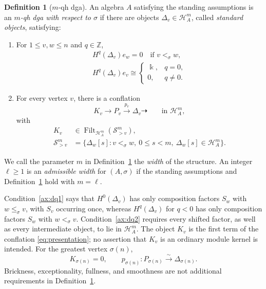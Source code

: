 \documentclass[11pt,a4paper]{article}
\newcommand{\defn}[1]{\textsl{\color{darkblue} #1}}
\renewcommand{\H}{\mathcal H}
\newcommand{\ZZ}{\mathbb{Z}}
\newcommand{\std}{\Delta}
\DeclareMathOperator{\Filt}{Filt}
\theoremstyle{plain}
\theoremstyle{definition}
\newtheorem{definition}[theorem]{Definition}
\numberwithin{equation}{section}
\begin{document}
\begin{definition}[$m$-qh dga]\label{def:dq}
An algebra $A$ satisfying the standing assumptions is an
\defn{$m$-qh dga with respect to $\sigma$} if there are objects
$\std_v\in\H_A^m$, called \defn{standard objects}, satisfying:
\begin{enumerate}[label=\textup{(dq\arabic*)},ref=dq\arabic*]
\item\label{ax:dq1} For $1\leq v,w\leq n$ and $q\in\ZZ$,
\begin{equation}\label{eq:dq1}
 \begin{gathered}
 H^q(\std_v)e_w=0\quad\text{if }v<_\sigma w,\\
 H^q(\std_v)e_v\cong
 \begin{cases}\Bbbk,&q=0,\\0,&q\neq0.
 \end{cases}
 \end{gathered}
\end{equation}
\item\label{ax:dq2} For every vertex $v$, there is a conflation
\begin{equation}\label{eq:presentation}
 K_v\longrightarrow P_v\xrightarrow{p_v}\std_v\dashrightarrow
 \qquad\text{in }\H_A^m,
\end{equation}
with
\begin{equation}\label{eq:kernel}
 \begin{aligned}
 K_v&\in\Filt_{\H_A^m}(\mathcal S_{>v}^{m}),\\
 \mathcal S_{>v}^{m}
 &=\{\std_w[s]:v<_\sigma w,\ 0\leq s<m,
                         \ \std_w[s]\in\H_A^m\}.
 \end{aligned}
\end{equation}
\end{enumerate}
\end{definition}

We call the parameter $m$ in Definition~\ref{def:dq} the
\defn{width} of the structure. An integer $\ell\geq1$ is an
\defn{admissible width} for $(A,\sigma)$ if the standing assumptions
and Definition~\ref{def:dq} hold with $m=\ell$.

Condition~\ref{ax:dq1} says that $H^0(\std_v)$ has only composition
factors $S_w$ with $w\leq_\sigma v$, with $S_v$ occurring once,
whereas $H^q(\std_v)$ for $q<0$ has only composition factors $S_w$
with $w<_\sigma v$. Condition~\ref{ax:dq2} requires every shifted
factor, as well as every intermediate object, to lie in $\H_A^m$.
The object $K_v$ is the first term of the conflation
\eqref{eq:presentation}; no assertion that $K_v$ is an ordinary
module kernel is intended. For the greatest vertex $\sigma(n)$,
\begin{equation}\label{eq:maximal-standard}
 K_{\sigma(n)}=0,\qquad p_{\sigma(n)}:
 P_{\sigma(n)}\xrightarrow{\sim}\std_{\sigma(n)}.
\end{equation}
Brickness, exceptionality, fullness, and smoothness are not additional
requirements in Definition~\ref{def:dq}.
\end{document}
